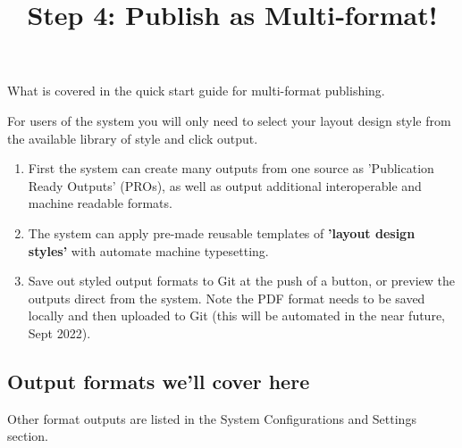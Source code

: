 \documentclass{article}
\begin{document}
\title{Step 4: Publish as Multi‑format!}

\maketitle


What is covered in the quick start guide for multi-format publishing.


For users of the system you will only need to select your layout design style from the available library of style and click output.

\begin{enumerate}
\item First the system can create many outputs from one source as 'Publication Ready Outputs' (PROs)\protect\footnotemark{}, as well as output additional interoperable and machine readable formats. 


\item The system can apply pre-made reusable templates of \textbf{'layout design styles'} with automate machine typesetting.


\item Save out styled output formats to Git at the push of a button, or preview the outputs direct from the system. Note the PDF format needs to be saved locally and then uploaded to Git (this will be automated in the near future, Sept 2022).


\end{enumerate}\addtocounter{footnote}{-1}

\subsection{Output formats we'll cover here}\label{H6462932}



Other format outputs are listed in the System Configurations and Settings section.
\end{document}
